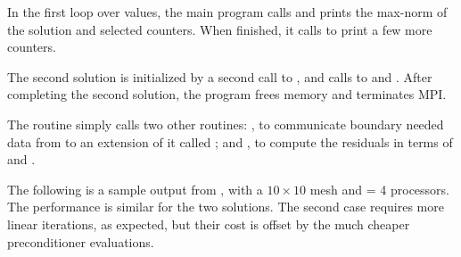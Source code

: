 In the first loop over  values, the main program calls 
and prints the max-norm of the solution and selected counters.  When finished,
it calls  to print a few more counters.

The second solution is initialized by a second call to ,
and calls to  and .  After completing the
second solution, the program frees memory and terminates MPI.

The  routine simply calls two other routines: ,
to communicate boundary needed data from  to an extension of it called
; and , to compute the residuals in terms of
 and .

The following is a sample output from , with a $10 \times 10$
mesh and  = 4 processors.  The performance is similar for the two
solutions.  The second case requires more linear iterations, as expected, 
but their cost is offset by the much cheaper preconditioner evaluations.


